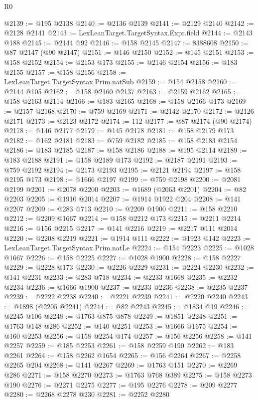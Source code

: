 \begin{lexlean}{R0}
\begin{coremodule}
@2139 := @195 @2138
@2140 := @2136 @2139
@2141 := @2129 @2140
@2142 := @2128 @2141
@2143 := LexLeanTarget.TargetSyntax.Expr.field
@2144 := @2143 @188
@2145 := @2144 @92
@2146 := @158 @2145
@2147 := 8388608
@2150 := @87 @2147 (@90 @2147)
@2151 := @146 @2150
@2152 := @145 @2151
@2153 := @158 @2152
@2154 := @2153 @173
@2155 := @2146 @2154
@2156 := @183 @2155
@2157 := @158 @2156
@2158 := LexLeanTarget.TargetSyntax.Prim.natSub
@2159 := @154 @2158
@2160 := @2144 @105
@2162 := @158 @2160 @2137
@2163 := @2159 @2162
@2165 := @158 @2163 @2114
@2166 := @183 @2165
@2168 := @158 @2166 @173
@2169 := @2157 @2168
@2170 := @759 @2169
@2171 := @2142 @2170
@2172 := @2126 @2171
@2173 := @2123 @2172
@2174 := 112
@2177 := @87 @2174 (@90 @2174)
@2178 := @146 @2177
@2179 := @145 @2178
@2181 := @158 @2179 @173
@2182 := @162 @2181
@2183 := @759 @2182
@2185 := @158 @2183 @2154
@2186 := @183 @2185
@2187 := @158 @2186
@2188 := @195 @2114
@2189 := @183 @2188
@2191 := @158 @2189 @173
@2192 := @2187 @2191
@2193 := @759 @2192
@2194 := @2173 @2193
@2195 := @2121 @2194
@2197 := @158 @2195 @173
@2198 := @1666 @2197
@2199 := @759 @2198
@2200 := @2081 @2199
@2201 := @2078 @2200
@2203 := @1689 (@2063 @2201)
@2204 := @82 @2203
@2205 := @1910 @2014
@2207 := @1914 @1922 @204
@2208 := @141 @2207
@2209 := @283 @713
@2210 := @2209 @1900
@2211 := @158 @2210
@2212 := @2209 @1667
@2214 := @158 @2212 @173
@2215 := @2211 @2214
@2216 := @156 @2215
@2217 := @141 @2216
@2219 := @2217 @111 @2014
@2220 := @2208 @2219
@2221 := @1914 @111
@2222 := @1923 @142
@2223 := LexLeanTarget.TargetSyntax.Prim.natLe
@2224 := @154 @2223
@2225 := @1028 @1667
@2226 := @158 @2225
@2227 := @1028 @1900
@2228 := @158 @2227
@2229 := @2228 @173
@2230 := @2226 @2229
@2231 := @2224 @2230
@2232 := @141 @2231
@2233 := @283 @718
@2234 := @2233 @1668
@2235 := @2232 @2234
@2236 := @1666 @1900
@2237 := @2233 @2236
@2238 := @2235 @2237
@2239 := @2222 @2238
@2240 := @2221 @2239
@2241 := @2220 @2240
@2243 := @1898 (@2205 @2241)
@2244 := @82 @2243
@2245 := @1834 @19
@2246 := @2245 @106
@2248 := @1763 @875 @878
@2249 := @1851 @2248
@2251 := @1763 @148 @286
@2252 := @140 @2251
@2253 := @1666 @1675
@2254 := @160 @2253
@2256 := @158 @2254 @174
@2257 := @156 @2256
@2258 := @141 @2257
@2259 := @185 @2253
@2261 := @158 @2259 @190
@2262 := @183 @2261
@2264 := @158 @2262 @1654
@2265 := @156 @2264
@2267 := @2258 @2265 @204
@2268 := @141 @2267
@2269 := @1763 @151
@2270 := @2269 @286
@2271 := @158 @2270
@2273 := @1763 @768 @389
@2275 := @158 @2273 @190
@2276 := @2271 @2275
@2277 := @195 @2276
@2278 := @209 @2277
@2280 := @2268 @2278 @230
@2281 := @2252 @2280

\end{coremodule}
\end{lexlean}
